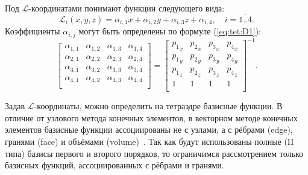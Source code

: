 \documentclass[a4paper,14pt]{article}
\begin{document}
\noindent Под $\mathcal{L}$-координатами понимают функции следующего вида:
\begin{equation*}
	\mathcal{L}_i (x, y, z) = \alpha_{i, 1} x + \alpha_{i, 2} y + \alpha_{i, 3} z + \alpha_{i, 4} , \text{~~~} i = \overline{1..4} . \label{eq:tet:L}
\end{equation*}
Коэффициенты $\alpha_{i, j}$ могут быть определены по формуле (\ref{eq:tet:D1}):
\begin{equation}
	\left[
	\begin{matrix}
		\alpha_{1, 1} & \alpha_{1, 2} & \alpha_{1, 3} & \alpha_{1, 4} \\
		\alpha_{2, 1} & \alpha_{2, 2} & \alpha_{2, 3} & \alpha_{2, 4} \\
		\alpha_{3, 1} & \alpha_{3, 2} & \alpha_{3, 3} & \alpha_{3, 4} \\
		\alpha_{4, 1} & \alpha_{4, 2} & \alpha_{4, 3} & \alpha_{4, 4} \\
	\end{matrix}
	\right] = \left[
	\begin{matrix}
		{p_1}_x & {p_2}_x & {p_3}_x & {p_4}_x \\
		{p_1}_y & {p_2}_y & {p_3}_y & {p_4}_y \\
		{p_1}_z & {p_2}_z & {p_3}_z & {p_4}_z \\
		1 & 1 & 1 & 1 \\
	\end{matrix}
	\right]^{-1} . \label{eq:tet:D1}
\end{equation}

Задав $\mathcal{L}$-координаты, можно определить на тетраэдре базисные функции. В отличие от узлового метода конечных элементов, в векторном методе конечных элементов базисные функции ассоциированы не с узлами, а с рёбрами (edge), гранями (face) и объёмами (volume)~\citep{nechaev, webb1999}. Так как будут использованы полные (II типа) базисы первого и второго порядков, то ограничимся рассмотрением только базисных функций, ассоциированных с рёбрами и гранями.
\end{document}
